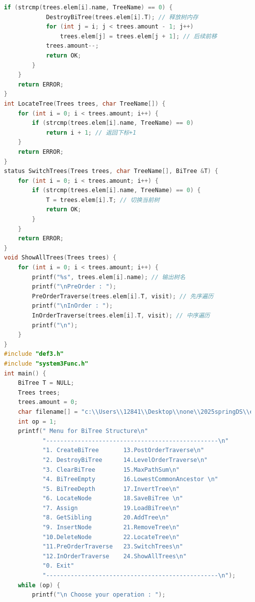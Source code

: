 \documentclass[supercite]{Experimental_Report}
\theoremstyle{definition}
\begin{document}
\begin{lstlisting}[language=c]
        if (strcmp(trees.elem[i].name, TreeName) == 0) {
            DestroyBiTree(trees.elem[i].T); // 释放树内存
            for (int j = i; j < trees.amount - 1; j++)
                trees.elem[j] = trees.elem[j + 1]; // 后续前移
            trees.amount--;
            return OK;
        }
    }
    return ERROR;
}
int LocateTree(Trees trees, char TreeName[]) {
    for (int i = 0; i < trees.amount; i++) {
        if (strcmp(trees.elem[i].name, TreeName) == 0)
            return i + 1; // 返回下标+1
    }
    return ERROR;
}
status SwitchTrees(Trees trees, char TreeName[], BiTree &T) {
    for (int i = 0; i < trees.amount; i++) {
        if (strcmp(trees.elem[i].name, TreeName) == 0) {
            T = trees.elem[i].T; // 切换当前树
            return OK;
        }
    }
    return ERROR;
}
void ShowAllTrees(Trees trees) {
    for (int i = 0; i < trees.amount; i++) {
        printf("%s", trees.elem[i].name); // 输出树名
        printf("\nPreOrder : ");
        PreOrderTraverse(trees.elem[i].T, visit); // 先序遍历
        printf("\nInOrder : ");
        InOrderTraverse(trees.elem[i].T, visit); // 中序遍历
        printf("\n");
    }
}
#include "def3.h"
#include "system3Func.h"
int main() {
    BiTree T = NULL;
    Trees trees;
    trees.amount = 0;
    char filename[] = "c:\\Users\\12841\\Desktop\\none\\2025springDS\\experiments\\ex3\\bitree.txt";
    int op = 1;
    printf(" Menu for BiTree Structure\n"
           "-------------------------------------------------\n"
           "1. CreateBiTree       13.PostOrderTraverse\n"
           "2. DestroyBiTree      14.LevelOrderTraverse\n"
           "3. ClearBiTree        15.MaxPathSum\n"
           "4. BiTreeEmpty        16.LowestCommonAncestor \n"
           "5. BiTreeDepth        17.InvertTree\n"
           "6. LocateNode         18.SaveBiTree \n"
           "7. Assign             19.LoadBiTree\n"
           "8. GetSibling         20.AddTree\n"
           "9. InsertNode         21.RemoveTree\n"
           "10.DeleteNode         22.LocateTree\n"
           "11.PreOrderTraverse   23.SwitchTrees\n"
           "12.InOrderTraverse    24.ShowAllTrees\n"
           "0. Exit"
           "-------------------------------------------------\n");
    while (op) {
        printf("\n Choose your operation : ");

\end{lstlisting}
\end{document}
